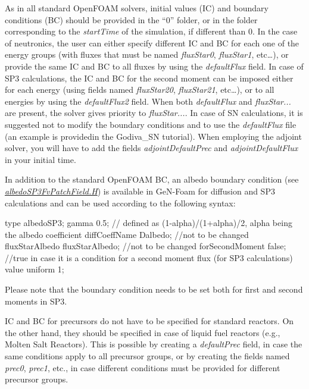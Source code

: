As in all standard Open\+F\+O\+AM solvers, initial values (IC) and boundary conditions (BC) should be provided in the “0” folder, or in the folder corresponding to the {\itshape start\+Time} of the simulation, if different than 0. In the case of neutronics, the user can either specify different IC and BC for each one of the energy groups (with fluxes that must be named {\itshape flux\+Star0}, {\itshape flux\+Star1}, etc…), or provide the same IC and BC to all fluxes by using the {\itshape default\+Flux} field. In case of S\+P3 calculations, the IC and BC for the second moment can be imposed either for each energy (using fields named {\itshape flux\+Star20}, {\itshape flux\+Star21}, etc…), or to all energies by using the {\itshape default\+Flux2} field. When both {\itshape default\+Flux} and {\itshape flux\+Star...} are present, the solver gives priority to {\itshape flux\+Star...}. In case of SN calculations, it is suggested not to modify the boundary conditions and to use the {\itshape default\+Flux} file (an example is providedin the Godiva\+\_\+\+SN tutorial). When employing the adjoint solver, you will have to add the fields {\itshape adjoint\+Default\+Prec} and {\itshape adjoint\+Default\+Flux} in your initial time.

In addition to the standard Open\+F\+O\+AM BC, an albedo boundary condition (see {\itshape \hyperlink{albedoSP3FvPatchField_8H}{albedo\+S\+P3\+Fv\+Patch\+Field.\+H}}) is available in Ge\+N-\/\+Foam for diffusion and S\+P3 calculations and can be used according to the following syntax\+:


\begin{DoxyCode}
type            albedoSP3;
gamma       0.5; // defined as (1-alpha)/(1+alpha)/2, alpha being the albedo coefficient
diffCoeffName   Dalbedo;  //not to be changed
fluxStarAlbedo  fluxStarAlbedo; //not to be changed
forSecondMoment false;  //true in case it is a condition for a second moment flux (for SP3 calculations)
value           uniform 1;
\end{DoxyCode}
 Please note that the boundary condition needs to be set both for first and second moments in S\+P3.

IC and BC for precursors do not have to be specified for standard reactors. On the other hand, they should be specified in case of liquid fuel reactors (e.\+g., Molten Salt Reactors). This is possible by creating a {\itshape default\+Prec} field, in case the same conditions apply to all precursor groups, or by creating the fields named {\itshape prec0}, {\itshape prec1}, etc., in case different conditions must be provided for different precursor groups.

